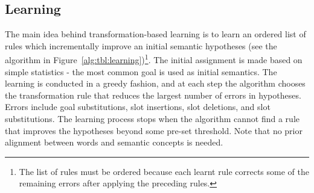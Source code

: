 \documentclass{article}
\begin{document}

\subsection{Learning} \label{sec:tbl:learning}
The main idea behind transformation-based learning \cite{brill95} is to learn an ordered list of rules which incrementally improve an initial semantic hypotheses (see the algorithm in Figure~\ref{alg:tbl:learning})\footnote{The list of rules must be ordered because each learnt rule corrects some of the remaining errors after applying the preceding rules.}. The initial assignment is made based on simple statistics - the most common goal is used as initial semantics. The learning is conducted in a greedy fashion, and at each step the algorithm chooses the transformation rule that reduces the largest number of errors in hypotheses. Errors include goal substitutions, slot insertions, slot deletions, and slot substitutions. The learning process stops when the algorithm cannot find a rule that improves the hypotheses beyond some pre-set threshold. Note that no prior alignment between words and semantic concepts is needed.
\end{document}
